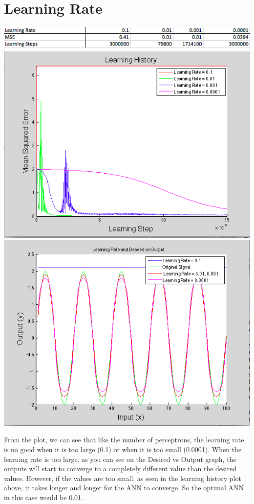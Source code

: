 \documentclass[epsfig]{article}
\begin{document}
\section*{Learning Rate}
\begin{center}
\includegraphics[scale=1]{pic12}
\includegraphics[scale=0.42]{pic13}
\includegraphics[scale=0.42]{pic14}
\end{center}
From the plot, we can see that like the number of perceptrons, the learning rate is no good when it is too large (0.1) or when it is too small (0.0001). When the learning rate is too large, as you can see on the Desired vs Output graph, the outputs will start to converge to a completely different value than the desired values. However, if the values are too small, as seen in the learning history plot above, it takes longer and longer for the ANN to converge. So the optimal ANN in this case would be 0.01.
\end{document}
